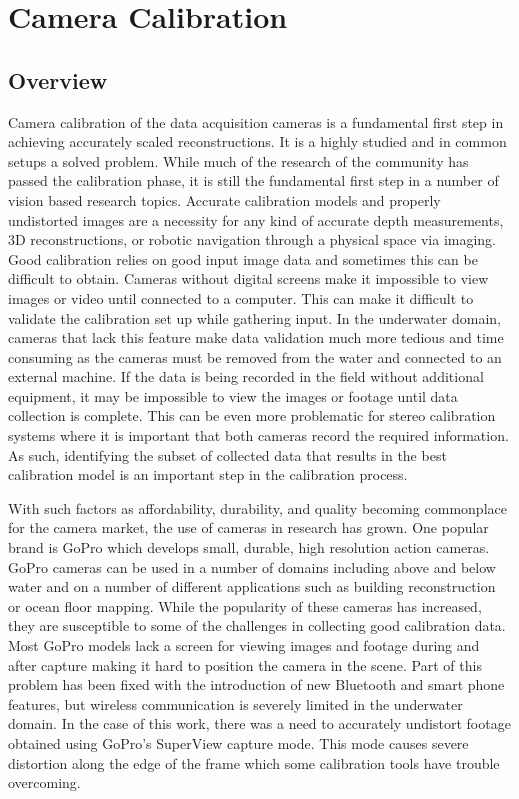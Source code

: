 \chapter{Camera Calibration}\label{chap:camcalib}
\section{Overview}\label{sec:caliboverview}
Camera calibration of the data acquisition cameras is a fundamental first step in achieving accurately scaled reconstructions. It is a highly studied and in common setups a solved problem. While much of the research of the community has passed the calibration phase, it is still the fundamental first step in a number of vision based research topics. Accurate calibration models and properly undistorted images are a necessity for any kind of accurate depth measurements, 3D reconstructions, or robotic navigation through a physical space via imaging. Good calibration relies on good input image data and sometimes this can be difficult to obtain. Cameras without digital screens make it impossible to view images or video until connected to a computer. This can make it difficult to validate the calibration set up while gathering input. In the underwater domain, cameras that lack this feature make data validation much more tedious and time consuming as the cameras must be removed from the water and connected to an external machine. If the data is being recorded in the field without additional equipment, it may be impossible to view the images or footage until data collection is complete. This can be even more problematic for stereo calibration systems where it is important that both cameras record the required information. As such, identifying the subset of collected data that results in the best calibration model is an important step in the calibration process.  

With such factors as affordability, durability, and quality becoming commonplace for the camera market, the use of cameras in research has grown. One popular brand is GoPro which develops small, durable, high resolution action cameras. GoPro cameras can be used in a number of domains including above and below water and on a number of different applications such as building reconstruction or ocean floor mapping. While the popularity of these cameras has increased, they are susceptible to some of the challenges in collecting good calibration data. Most GoPro models lack a screen for viewing images and footage during and after capture making it hard to position the camera in the scene. Part of this problem has been fixed with the introduction of new Bluetooth and smart phone features, but wireless communication is severely limited in the underwater domain. In the case of this work, there was a need to accurately undistort footage obtained using GoPro's SuperView capture mode. This mode causes severe distortion along the edge of the frame which some calibration tools have trouble overcoming. 

